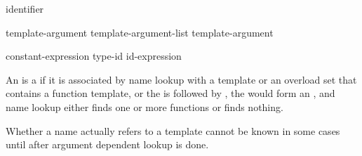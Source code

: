 \begin{bnf}
\br
  identifier
\end{bnf}

\begin{bnf}
\br
  template-argument \br
  template-argument-list \terminal{,} template-argument 
\end{bnf}

\begin{bnf}
\br
  constant-expression\br
  type-id\br
  id-expression
\end{bnf}

\pnum
An  is a 
if it is associated by name lookup with
a template or an overload set that contains a function template, or
the  is followed by \tcode{<},
the  would form an , and
name lookup either finds one or more functions or finds nothing.
\begin{note}
Whether a name actually refers to a template
cannot be known in some cases
until after argument dependent lookup is done.
\end{note}

